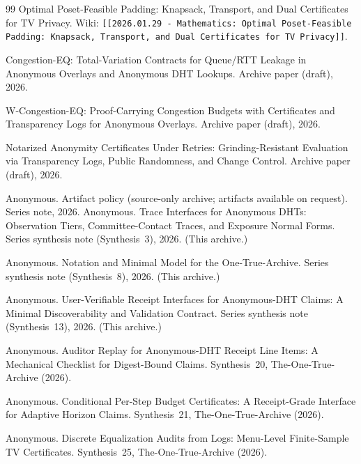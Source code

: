 \documentclass[11pt]{article}
\begin{document}
\begin{thebibliography}{99}
Optimal Poset-Feasible Padding: Knapsack, Transport, and Dual Certificates for TV Privacy.
\newblock Wiki: \texttt{[[2026.01.29 - Mathematics: Optimal Poset-Feasible Padding: Knapsack, Transport, and Dual Certificates for TV Privacy]]}.

Congestion-EQ: Total-Variation Contracts for Queue/RTT Leakage in Anonymous Overlays and Anonymous DHT Lookups.
\newblock Archive paper (draft), 2026.

W-Congestion-EQ: Proof-Carrying Congestion Budgets with Certificates and Transparency Logs for Anonymous Overlays.
\newblock Archive paper (draft), 2026.

Notarized Anonymity Certificates Under Retries: Grinding-Resistant Evaluation via Transparency Logs, Public Randomness, and Change Control.
\newblock Archive paper (draft), 2026.


Anonymous.
\newblock Artifact policy (source-only archive; artifacts available on request).
\newblock Series note, 2026.
Anonymous.
\newblock Trace Interfaces for Anonymous DHTs: Observation Tiers, Committee-Contact Traces, and Exposure Normal Forms.
\newblock Series synthesis note (Synthesis~3), 2026. (This archive.)

Anonymous.
\newblock Notation and Minimal Model for the One-True-Archive.
\newblock Series synthesis note (Synthesis~8), 2026. (This archive.)


Anonymous.
\newblock User-Verifiable Receipt Interfaces for Anonymous-DHT Claims: A Minimal Discoverability and Validation Contract.
\newblock Series synthesis note (Synthesis~13), 2026. (This archive.)

Anonymous.
\newblock Auditor Replay for Anonymous-DHT Receipt Line Items: A Mechanical Checklist for Digest-Bound Claims.
\newblock Synthesis~20, The-One-True-Archive (2026).

Anonymous.
\newblock Conditional Per-Step Budget Certificates: A Receipt-Grade Interface for Adaptive Horizon Claims.
\newblock Synthesis~21, The-One-True-Archive (2026).

Anonymous.
\newblock Discrete Equalization Audits from Logs: Menu-Level Finite-Sample TV Certificates.
\newblock Synthesis~25, The-One-True-Archive (2026).

\end{thebibliography}
\end{document}
